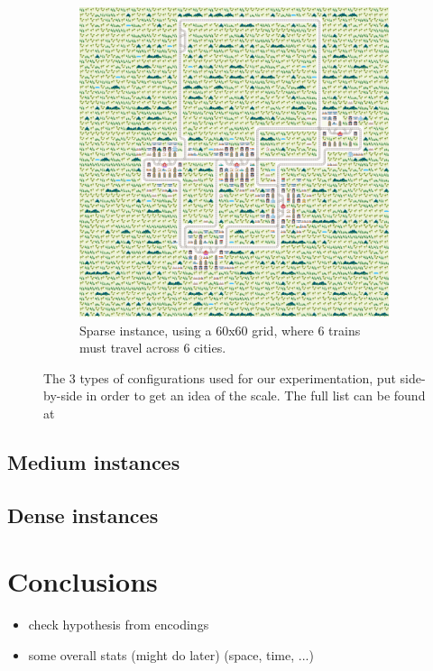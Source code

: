 \documentclass{llncs}
\begin{document}
\begin{figure}
\begin{minipage}{.41\textwidth}
	\end{minipage}
	\hfill
	\begin{minipage}{.49\textwidth}
				\begin{subfigure}{\textwidth}
		\centering
		\includegraphics[width=\textwidth]{sparse/sparse_0_1}
		\caption{Sparse instance, using a 60x60 grid, where 6 trains must travel across 6 cities.}
		\label{sparse_0_1}
				\end{subfigure}
	\end{minipage}
	\caption{The 3 types of configurations used for our experimentation, put side-by-side in order to get an idea of the scale. The full list can be found at \cite{instance_folder}}
	\label{sparse_medium_dense}
\end{figure}

\subsection{Medium instances}

\subsection{Dense instances}



\section{Conclusions}
\color{blue}
\begin{itemize}
	\item check hypothesis from encodings
	\item some overall stats (might do later) (space, time, ...)
\end{itemize}
\color{black}
\end{document}
